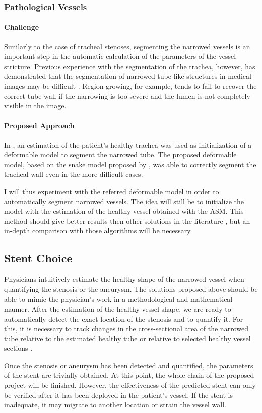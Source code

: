 \documentclass[a4paper]{article}
\newcommand{\challenge}{\paragraph{Challenge}}
\newcommand{\approach}{\paragraph{Proposed Approach}}
\newcommand{\citep}{\cite}
\begin{document}
\subsubsection{Pathological Vessels}
\label{sec:narrowedarteries}

\challenge
Similarly to the case of tracheal stenoses, segmenting the narrowed vessels is an important step in the automatic calculation of the parameters of the vessel stricture. Previous experience with the segmentation of the trachea, however, has demonstrated that the segmentation of narrowed tube-like structures in medical images may be difficult \citep{Triglia,Pinho:Trachea7}. Region growing, for example, tends to fail to recover the correct tube wall if the narrowing is too severe and the lumen is not completely visible in the image. 

\approach

In \citep{Pinho:Trachea4}, an estimation of the patient's healthy trachea was used as initialization of a deformable model to segment the narrowed tube. The proposed deformable model, based on the snake model proposed by \citep{Kass}, was able to correctly segment the tracheal wall even in the more difficult cases. 

I will thus experiment with the referred deformable model in order to automatically segment narrowed vessels. The idea will still be to initialize the model with the estimation of the healthy vessel obtained with the ASM. This method should give better results then other solutions in the literature \citep{CARR-07,Florez2,Antiga,Bemmel}, but an in-depth comparison with those algorithms will be necessary.

\subsection{Stent Choice}

Physicians intuitively estimate the healthy shape of the narrowed vessel when quantifying the stenosis or the aneurysm. The solutions proposed above should be able to mimic the physician's work in a methodological and mathematical manner. After the estimation of the healthy vessel shape, we are ready to automatically detect the exact location of the stenosis and to quantify it. For this, it is necessary to track changes in the cross-sectional area of the narrowed tube relative to the estimated healthy tube \citep{Pinho:Trachea4} or relative to selected healthy vessel sections \citep{Florez2,Bemmel}.

Once the stenosis or aneurysm has been detected and quantified, the parameters of the stent are trivially obtained. At this point, the whole chain of the proposed project will be finished. However, the effectiveness of the predicted stent can only be verified after it has been deployed in the patient's vessel. If the stent is inadequate, it may migrate to another location or strain the vessel wall. 
\end{document}
